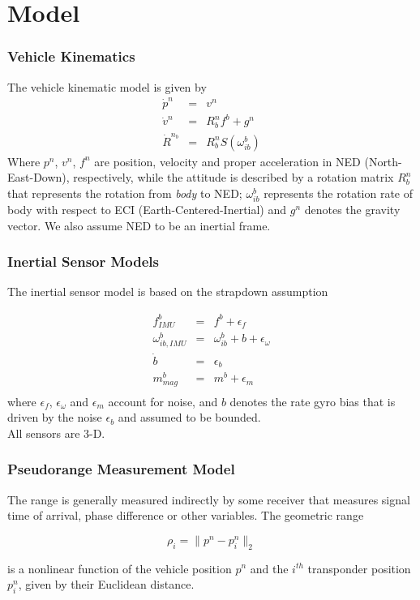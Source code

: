 \documentclass{beamer}
\begin{document}
\section{Model}
	\begin{frame}
	\frametitle{Vehicle Kinematics}
	The vehicle kinematic model is given by
	\begin{eqnarray*}
	 \dot{p}^n &=& v^n \\
	 \dot{v}^n &=& R^n_b f^b + g^n \\
	 \dot{R}^{n_b} &=& R^n_bS(\omega^b_{ib})
	\end{eqnarray*}
	Where $p^n$, $v^n$, $f^n$ are position, velocity and proper acceleration in NED (North-East-Down), respectively, while the attitude is described by a rotation matrix $R^n_b$ that represents the rotation from \textit{body} to NED; $\omega^b_{ib}$ represents the rotation rate of body with respect to ECI (Earth-Centered-Inertial) and $g^n$ denotes the gravity vector. We also assume NED to be an inertial frame. 
	
	\end{frame}
	
	\begin{frame}
	\frametitle{Inertial Sensor Models}
	The inertial sensor model is based on the strapdown assumption
	
	\begin{eqnarray*}
	f^b_{IMU} &=& f^b + \epsilon_f \\
	\omega^b_{ib,IMU} &=& \omega^b_{ib} + b + \epsilon_\omega \\
	\dot{b} &=& \epsilon_b \\
	m^b_{mag} &=& m^b + \epsilon_m \\
	\end{eqnarray*}
	where $\epsilon_f$, $\epsilon_\omega$ and $\epsilon_m$ account for noise, and $b$ denotes the rate gyro bias that is driven by the noise $\epsilon_b$ and assumed to be bounded.  
	\\ All sensors are 3-D.
	\end{frame}

	\begin{frame}
	\frametitle{Pseudorange Measurement Model}
	The range is generally measured indirectly by some receiver that measures signal time of arrival, phase difference or other variables. The geometric range 
	
	\[ \rho_i = \|p^n - p^n_i\|_2 \]
	
	is a nonlinear function of the vehicle position $p^n$ and the $i^{th}$ transponder position $p^n_i$, given by their Euclidean distance.
	\end{frame}
	
\end{document}
